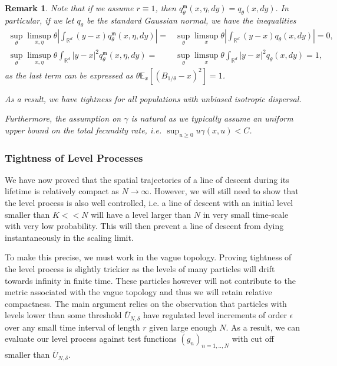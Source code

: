 \documentclass[12pt]{article}
\newtheorem{remark}[theorem]{Remark}
\newcommand{\IR}{\mathbb R}
\begin{document}
\begin{remark}
Note that if we assume $r \equiv 1$, then 
$q^{\mathfrak{m}}_{\theta}(x,\eta,dy)=q_{\theta}(x,dy).$
In particular, if we let $q_{\theta}$ be the standard Gaussian normal, we have the inequalities
\begin{align}
   \sup_{\theta}\limsup_{x, \eta} \theta \left| \int_{\IR^d} (y-x) q^{\mathfrak{m}}_{ \theta}(x,\eta,dy) \right| =& \sup_{\theta}\limsup_{x} \theta \left| \int_{\IR^d} (y-x) q_{\theta}(x,dy) \right| =  0,\\
   \sup_{\theta}\limsup_{x, \eta} \theta \int_{\IR^d} |y-x|^2 q^{\mathfrak{m}}_{ \theta}(x,\eta,dy)  =& \sup_{\theta}\limsup_{x} \theta \int_{\IR^d} |y-x|^2 q_{\theta}(x,dy) =  1,
\end{align}
as the last term can be expressed as $\theta \mathbb{E}_{x}[(B_{1/\theta}-x)^2]=1$.

As a result, we have tightness for all populations with unbiased isotropic dispersal.

Furthermore, the assumption on $\gamma$ is natural as we typically assume an uniform upper bound on the total fecundity rate, i.e.
$\sup_{u \geq 0} u\gamma(x,u) < C$.
\end{remark}


\subsubsection{Tightness of Level Processes}
We have now proved that the spatial trajectories of a line of descent during its lifetime is relatively compact as $N \to \infty$. However, we will still need to show that the level process is also well controlled, i.e. a line of descent with an initial level smaller than $K << N$ will have a level larger than $N$ in very small time-scale with very low probability. This will then prevent a line of descent from dying instantaneously in the scaling limit.

To make this precise, we must work in the vague topology. Proving tightness of the level process is slightly trickier as the levels of many particles will drift towards infinity in finite time. These particles however will not contribute to the metric associated with the vague topology and thus we will retain relative compactness. The main argument relies on the observation that particles with levels lower than some threshold $\overline{U}_{N, \delta}$  have regulated level increments of order $\epsilon$ over any small time interval of length $r$ given large enough $N$. As a result, we can evaluate our level process against test functions $(g_n)_{n=1,..,N}$ with cut off smaller than $\overline{U}_{N, \delta}$. 
\end{document}
